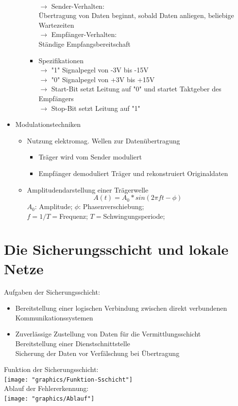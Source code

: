 \documentclass{scrreprt}
\begin{document}
\begin{itemize}
\begin{itemize}
\begin{itemize}
				\\$\rightarrow$ Sender-Verhalten:
				\\ Übertragung von Daten beginnt, sobald Daten anliegen, beliebige Wartezeiten
				\\$\rightarrow$ Empfänger-Verhalten:
				\\Ständige Empfangsbereitschaft
				\item Spezifikationen
				\\$\rightarrow$ "1" Signalpegel von -3V bis -15V
				\\$\rightarrow$ "0" Signalpegel von +3V bis +15V
				\\$\rightarrow$ Start-Bit setzt Leitung auf "0" und startet Taktgeber des Empfängers
				\\$\rightarrow$ Stop-Bit setzt Leitung auf "1"
			\end{itemize}
	      \end{itemize}
	\item Modulationstechniken
	\begin{itemize}
		\item Nutzung elektromag. Wellen zur Datenübertragung
		\begin{itemize}
			\item Träger wird vom Sender moduliert
			\item Empfänger demoduliert Träger und rekonstruiert Originaldaten
		\end{itemize}
		\item Amplitudendarstellung einer Trägerwelle
		$$A(t) = A_{0}*sin(2\pi ft -\phi )$$
		$A_{0}$: Amplitude; $\phi$: Phasenverschiebung;
		\\$f=1/T=$Frequenz; $T=$Schwingungsperiode;
	\end{itemize}
\end{itemize}
\chapter{Die Sicherungsschicht und lokale Netze}
Aufgaben der Sicherungsschicht:
\begin{itemize}
	\item Bereitstellung einer logischen Verbindung zwischen direkt verbundenen Kommunikationssystemen
	\item Zuverlässige Zustellung von Daten für die Vermittlungsschicht
	\\Bereitstellung einer Dienstschnittstelle
	\\Sicherung der Daten vor Verfälschung bei Übertragung
\end{itemize}
Funktion der Sicherungsschicht:
\\\texttt{[image: "graphics/Funktion-Sschicht"]}
\\Ablauf der Fehlererkennung:
\\\texttt{[image: "graphics/Ablauf"]}
\end{document}
